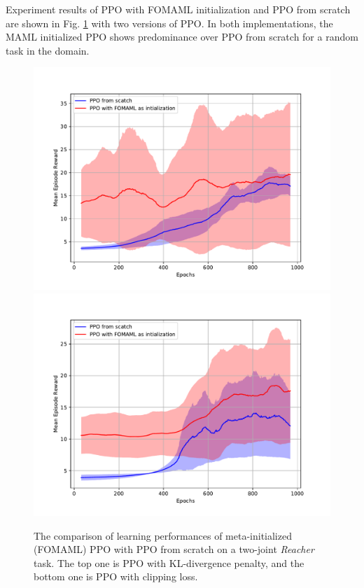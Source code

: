 \documentclass{article}
\begin{document}
Experiment results of PPO with FOMAML initialization and PPO from scratch are shown in Fig. \ref{fig:fomaml} with two versions of PPO. In both implementations, the MAML initialized PPO shows predominance over PPO from scratch for a random task in the domain.

\begin{figure}[htbp]
	\centering
	\includegraphics[scale=0.5]{img/fomaml.pdf}
	\includegraphics[scale=0.5]{img/fomaml2.pdf}
	\caption{The comparison of learning performances of meta-initialized (FOMAML) PPO with PPO from scratch on a two-joint \textit{Reacher} task. The top one is PPO with KL-divergence penalty, and the bottom one is PPO with clipping loss.}
	\label{fig:fomaml}
\end{figure}
\end{document}

